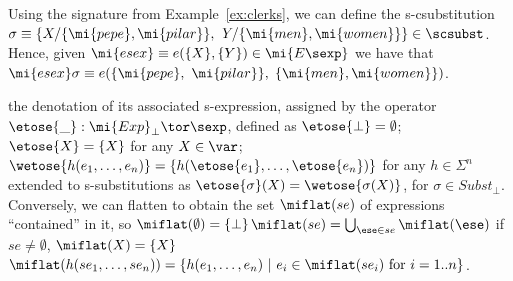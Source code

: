 \begin{example}
Using the signature from Example~\ref{ex:clerks}, we can define the s-csubstitution
$\sigma \equiv \{ X / \{\mi{pepe}, \mi{pilar}\},$
$Y / \{\mi{men}, \mi{women}\}\} \in \scsubst$. Hence, given
$\mi{esex} \equiv e(\{X\}, \{Y\}) \in \mi{E\sexp}$ we have that
$\mi{esex}\sigma \equiv e(\{\mi{pepe},$ $\mi{pilar}\},$ $\{\mi{men}, \mi{women}\})$.
\end{example}

the denotation of its associated s-expression, assigned by the operator $\etose{\_} : \mi{Exp}_\perp \tor \sexp$, defined as $\etose{\bot}=\emptyset$; $\etose{X} = \{X\}$ for any $X\in\var$; $\wetose{h(e_1, \ldots, e_n)} = \{h(\etose{e_1}, \ldots, \etose{e_n})\}$ for any $h\in\Sigma^n$\shorttxt{, } extended to s-substitutions as $\etose{\sigma}(X)=\wetose{\sigma(X)}$, for $\sigma \in Subst_\perp$.  Conversely, we can flatten  to obtain the set $\miflat(se)$ of expressions ``contained'' in it, so $\miflat(\emptyset)=\{\bot\}$\shorttxt{, }$\miflat(se)=\bigcup_{\ese\in se} \miflat(\ese)$ if $se\not=\emptyset$,  $\miflat(X)=\{X\}$\longtxt{ ; }\shorttxt{, }$\miflat(h(se_1,\ldots,se_n))=\{h(e_1,\ldots,e_n)~|~e_i\in \miflat(se_i)\mbox{ for } i=1..n\}$. 
